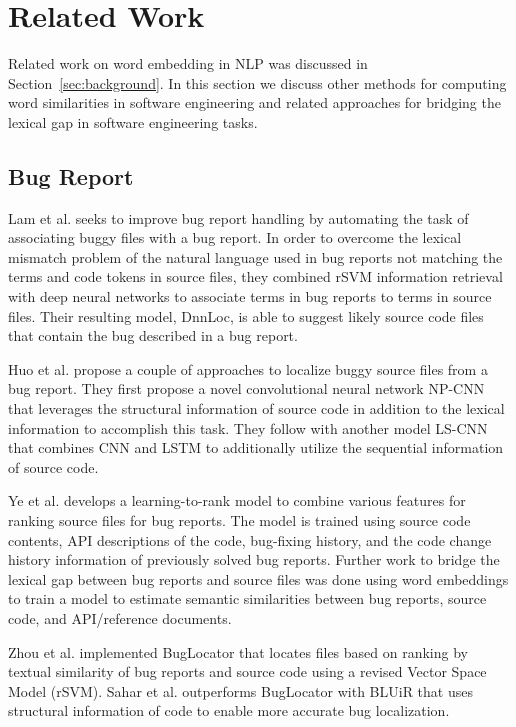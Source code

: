 \section{Related Work}
\label{sec:related word}

Related work on word embedding in NLP was discussed in Section~\ref{sec:background}. In this section we discuss other methods for computing word similarities in software engineering and related approaches for bridging the lexical gap in software engineering tasks.

\subsection{Bug Report}

Lam et al. \cite{7372035} seeks to improve bug report handling by automating the task of associating buggy files with a bug report.  In order to overcome the lexical mismatch problem of the natural language used in bug reports not matching the terms and code tokens in source files, they combined rSVM information retrieval with deep neural networks to associate terms in bug reports to terms in source files.  Their resulting model, DnnLoc, is able to suggest likely source code files that contain the bug described in a bug report.

Huo et al. \cite{Huo:2017:EUF:3172077.3172153, Huo:2016:LUF:3060832.3060845} propose a couple of approaches to localize buggy source files from a bug report.  They first propose a novel convolutional neural network NP-CNN that leverages the structural information of source code in addition to the lexical information to accomplish this task.  They follow with another model LS-CNN that combines CNN and LSTM to additionally utilize the sequential information of source code.

Ye et al. \cite{Ye:ICSE16, Ye:FSE14} develops a learning-to-rank model to combine various features for ranking source files for bug reports.  The model is trained using source code contents, API descriptions of the code, bug-fixing history, and the code change history information of previously solved bug reports.  Further work to bridge the lexical gap between bug reports and source files was done using word embeddings to train a model to estimate semantic similarities between bug reports, source code, and API/reference documents.

Zhou et al. \cite{Zhou:2012:BFM:2337223.2337226} implemented BugLocator that locates files based on ranking by textual similarity of bug reports and source code using a revised Vector Space Model (rSVM).  Sahar et al. \cite{Saha:2013:ASE:6693093} outperforms BugLocator with BLUiR that uses structural information of code to enable more accurate bug localization.

